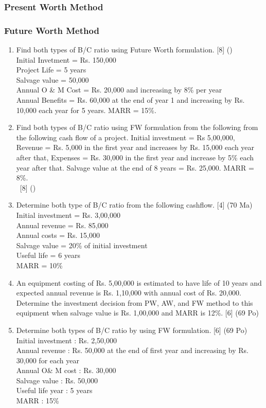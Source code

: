 \documentclass[12pt]{article}
\newcommand{\enter}{\\\textcolor{white}{1}}
\begin{document}
\subsubsection{Present Worth Method}
\subsubsection{Future Worth Method}
\begin{enumerate}[noitemsep, topsep = 0pt]
	\item Find both types of B/C ratio using Future Worth formulation. \hfill [8] ()\\
	Initial Invetment = Rs. 150,000\\
	Project Life = 5 years\\
	Salvage value = 50,000\\
	Annual O \& M Cost = Rs. 20,000 and increasing by 8\% per year\\
	Annual Benefits = Rs. 60,000 at the end of year 1 and increasing by Rs. 10,000 each year for 5 years. MARR = 15\%.
	
	\item Find both types of B/C ratio using FW formulation from the following from the following cash flow of a project. Initial investment = Rs 5,00,000, Revenue = Rs. 5,000 in the first year and increases by Rs. 15,000 each year after that, Expenses = Rs. 30,000 in the first year and increase by 5\% each year after that. Salvage value at the end of 8 years = Rs. 25,000. MARR = 8\%. 
	\enter\hfill [8] ()
	
	\item Determine both type of B/C ratio from the following cashflow. \hfill [4] (70 Ma)\\
	Initial investment = Rs. 3,00,000\\
	Annual revenue = Rs. 85,000\\
	Annual costs = Rs. 15,000\\
	Salvage value = 20\% of initial investment\\
	Useful life = 6 years\\
	MARR = 10\%
	
	\item An equipment costing of Rs. 5,00,000 is estimated to have life of 10 years and expected annual revenue is Rs. 1,10,000 with annual cost of Rs. 20,000. Determine the investment decision from PW, AW, and FW method to this equipment when salvage value is Rs. 1,00,000 and MARR is 12\%. \hfill [6] (69 Po)
	
	\item Determine both types of B/C ratio by using FW formulation. \hfill [6] (69 Po)\\
	Initial investment : Rs. 2,50,000\\
	Annual revenue     : Rs. 50,000 at the end of first year and increasing by Rs. 30,000 for each year\\
	Annual O\& M cost  : Rs. 30,000\\
	Salvage value      : Rs. 50,000\\
	Useful life year   : 5 years\\
	MARR               : 15\%	
\end{enumerate}
\end{document}
